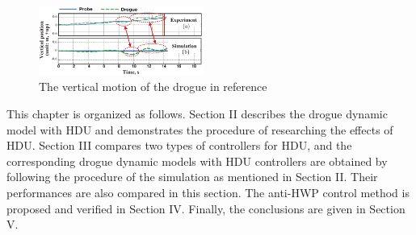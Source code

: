 \begin{figure}[ptb]
	\begin{centering}
		\includegraphics[width=0.48\textwidth]{Figures/Figs_Ch8/Fig01} 
		\par\end{centering}
	\caption{The vertical motion of the drogue in reference \protect \cite{Wei2015}}
	\label{F_Wei_2015} 
\end{figure}

This chapter is organized as follows. Section II describes the drogue dynamic model with HDU and demonstrates the procedure of researching the effects of HDU. Section III compares two types of controllers for HDU, and the corresponding drogue dynamic models with HDU controllers are obtained by following the procedure of the simulation as mentioned in Section II. Their performances are also compared in this section. The anti-HWP control method is proposed and verified in Section IV. Finally, the conclusions are given in Section V.

